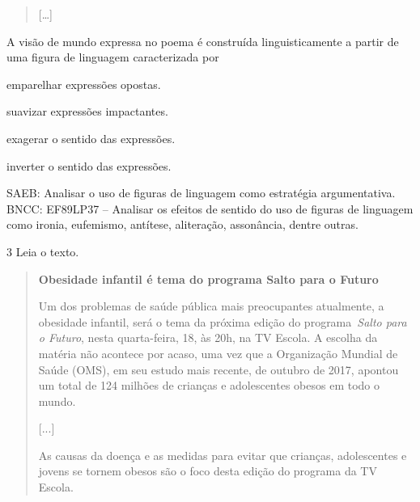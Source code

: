 \begin{quote}
{[}\ldots{]}
\end{quote}


A visão de mundo expressa no poema é construída linguisticamente a
partir de uma figura de linguagem caracterizada por

\begin{escolha}
\item emparelhar expressões opostas.

\item suavizar expressões impactantes.

\item exagerar o sentido das expressões.

\item inverter o sentido das expressões.
\end{escolha}

SAEB: Analisar o uso de figuras de linguagem como estratégia
argumentativa. BNCC: EF89LP37 -- Analisar os efeitos de sentido do uso
de figuras de linguagem como ironia, eufemismo, antítese, aliteração,
assonância, dentre outras.

\num{3} Leia o texto.

\begin{quote}
\textbf{Obesidade infantil é tema do programa Salto para o Futuro}

Um dos problemas de saúde pública mais preocupantes atualmente, a
obesidade infantil, será o tema da próxima edição do
programa~\emph{Salto para o Futuro}, nesta quarta-feira, 18, às 20h, na
TV Escola. A escolha da matéria não acontece por acaso, uma vez que a
Organização Mundial de Saúde (OMS), em seu estudo mais recente, de
outubro de 2017, apontou um total de 124 milhões de crianças e
adolescentes obesos em todo o mundo.

{[}...{]}

As causas da doença e as medidas para evitar que crianças, adolescentes
e jovens se tornem obesos são o foco desta edição do programa da TV
Escola.
\end{quote}


